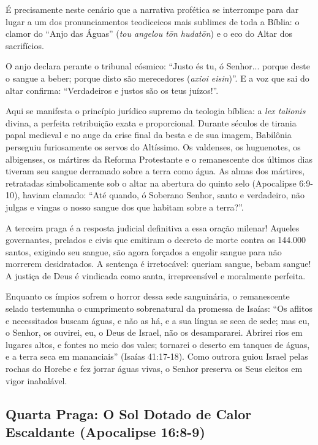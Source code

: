 É precisamente neste cenário que a narrativa profética se interrompe para dar lugar a um dos pronunciamentos teodiceicos mais sublimes de toda a Bíblia: o clamor do ``Anjo das Águas'' (\textit{tou angelou tōn hudatōn}) e o eco do Altar dos sacrifícios.

O anjo declara perante o tribunal cósmico: ``Justo és tu, ó Senhor... porque deste o sangue a beber; porque disto são merecedores (\textit{axioi eisin})''. E a voz que sai do altar confirma: ``Verdadeiros e justos são os teus juízos!''.

Aqui se manifesta o princípio jurídico supremo da teologia bíblica: a \textit{lex talionis} divina, a perfeita retribuição exata e proporcional. Durante séculos de tirania papal medieval e no auge da crise final da besta e de sua imagem, Babilônia perseguiu furiosamente os servos do Altíssimo. Os valdenses, os huguenotes, os albigenses, os mártires da Reforma Protestante e o remanescente dos últimos dias tiveram seu sangue derramado sobre a terra como água. As almas dos mártires, retratadas simbolicamente sob o altar na abertura do quinto selo (Apocalipse 6:9-10), haviam clamado: ``Até quando, ó Soberano Senhor, santo e verdadeiro, não julgas e vingas o nosso sangue dos que habitam sobre a terra?''.

A terceira praga é a resposta judicial definitiva a essa oração milenar! Aqueles governantes, prelados e civis que emitiram o decreto de morte contra os 144.000 santos, exigindo seu sangue, são agora forçados a engolir sangue para não morrerem desidratados. A sentença é irretocável: queriam sangue, bebam sangue! A justiça de Deus é vindicada como santa, irrepreensível e moralmente perfeita.

Enquanto os ímpios sofrem o horror dessa sede sanguinária, o remanescente selado testemunha o cumprimento sobrenatural da promessa de Isaías: ``Os aflitos e necessitados buscam águas, e não as há, e a sua língua se seca de sede; mas eu, o Senhor, os ouvirei, eu, o Deus de Israel, não os desampararei. Abrirei rios em lugares altos, e fontes no meio dos vales; tornarei o deserto em tanques de águas, e a terra seca em mananciais'' (Isaías 41:17-18). Como outrora guiou Israel pelas rochas do Horebe e fez jorrar águas vivas, o Senhor preserva os Seus eleitos em vigor inabalável.



\subsection{Quarta Praga: O Sol Dotado de Calor Escaldante (Apocalipse 16:8-9)}


